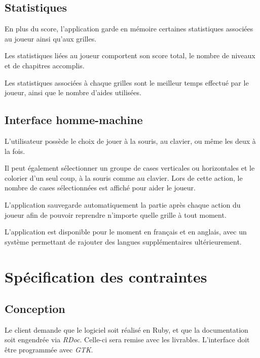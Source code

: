 \documentclass[a4paper, 12pt]{report}
\begin{document}
		\section{Statistiques}
		\vspace*{0.2cm}
		
			En plus du score, l'application garde en mémoire certaines statistiques associées au joueur ainsi qu'aux grilles. 
			
			Les statistiques liées au joueur comportent son score total, le nombre de niveaux et de chapitres accomplis. 
		
			Les statistiques associées à chaque grilles sont le meilleur temps effectué par le joueur, ainsi que le nombre d'aides utilisées.

		\section{Interface homme-machine}
		\vspace*{0.2cm}
		
			L'utilisateur possède le choix de jouer à la souris, au clavier, ou même les deux à la fois.
			
			Il peut également sélectionner un groupe de cases verticales ou horizontales et le colorier d'un seul coup, à la souris comme au clavier. Lors de cette action, le nombre de cases sélectionnées est affiché pour aider le joueur. 
			
			L'application sauvegarde automatiquement la partie après chaque action du joueur afin de pouvoir reprendre n'importe quelle grille à tout moment.
			
			L'application est disponible pour le moment en français et en anglais, avec un système permettant de rajouter des langues supplémentaires ultérieurement.


\chapter{Spécification des contraintes}
\thispagestyle{empty}
\thispagestyle{plain}
\vspace*{0.5cm}
	\section{Conception}
	\vspace*{0.2cm}
	
		Le client demande que le logiciel soit réalisé en Ruby, et que la documentation soit engendrée via \textit{RDoc}. Celle-ci sera remise avec les livrables. L'interface doit être programmée avec \textit{GTK}.
		
\end{document}
